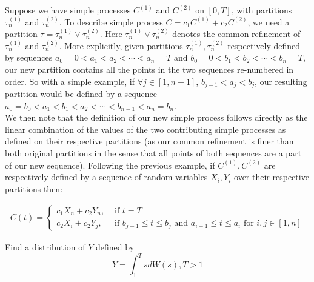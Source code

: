\documentclass[12pt,twoside, letter]{exam}
\theoremstyle{definition}
\begin{document}
\begin{solution}
Suppose we have simple processes $C^{(1)}$ and $C^{(2)}$ on $[0,T]$, with partitions $\tau_{n}^{(1)}$ and $\tau_{n}^{(2)}$.
To describe simple process $C = c_1C^{(1)}+c_2C^{(2)}$, we need a partition $\tau = \tau_{n}^{(1)}\vee\tau_{n}^{(2)}$.
Here $\tau_{n}^{(1)}\vee\tau_{n}^{(2)}$ denotes the common refinement of $\tau_{n}^{(1)}$ and $\tau_{n}^{(2)}$.
More explicitly, given partitions $\tau_{n}^{(1)},\tau_{n}^{(2)}$ respectively defined by sequences
$a_0 = 0 < a_1 < a_2 < \cdots < a_{n} = T$ and $b_0 = 0 < b_1 < b_2 < \cdots < b_n = T$, our new partition
contains all the points in the two sequences re-numbered in order. So with a simple example, if $\forall j \in [1,n-1]$,
$b_{j-1} < a_{j} < b_{j}$, our resulting partition would be defined by a sequence
$a_0 = b_0 < a_1 < b_1 < a_2 < \cdots < b_{n-1} < a_n = b_n$. \\
We then note that the definition of our new simple process follows directly as the linear combination of the values of
the two contributing simple processes as defined on their respective partitions (as our common refinement is finer than
both original partitions in the sense that all points of both sequences are a part of our new sequence). Following the previous
example, if $C^{(1)},C^{(2)}$ are respectively defined by a sequence of random variables $X_{i},Y_{i}$ over their respective partitions
then:

\begin{align*}
  C(t) =
  \begin{cases}
    c_1X_n + c_2Y_n, &\text{ if $t=T$} \\
    c_2X_i + c_2Y_j, &\text{ if $b_{j-1} \leq t \leq b_{j}$ and $a_{i-1} \leq t \leq a_{i}$ for $i,j \in [1,n]$}
  \end{cases}
\end{align*}

\end{solution}

Find a distribution of $Y$ defined by
  \begin{equation*}
    Y = \int^{T}_{1} sdW(s), T > 1
  \end{equation*}
\end{document}
